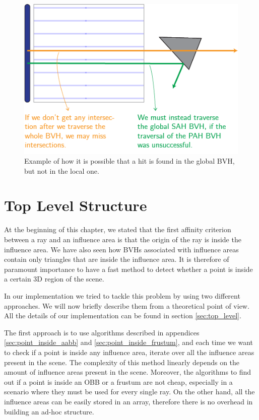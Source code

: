 \documentclass{PoliMi_MasterThesis}
\begin{document}
\begin{figure}[H]
    \centering
    \includegraphics[width=\textwidth*\real{0.55}]{Images/outside_area.png}
    \caption{Example of how it is possible that a hit is found in the global BVH, but not in the local one.}
    \label{fig:outside_area}
\end{figure}

\section{Top Level Structure} \label{sec:top_level_structure}
At the beginning of this chapter, we stated that the first affinity criterion between a ray and an influence area is that the origin of the ray is inside the influence area. We have also seen how BVHs associated with influence areas contain only triangles that are inside the influence area. It is therefore of paramount importance to have a fast method to detect whether a point is inside a certain 3D region of the scene. 

In our implementation we tried to tackle this problem by using two different approaches. We will now briefly describe them from a theoretical point of view. All the details of our implementation can be found in section \ref{sec:top_level}.

The first approach is to use algorithms described in appendices \ref{sec:point_inside_aabb} and \ref{sec:point_inside_frustum}, and each time we want to check if a point is inside any influence area, iterate over all the influence areas present in the scene. The complexity of this method linearly depends on the amount of influence areas present in the scene. Moreover, the algorithms to find out if a point is inside an OBB or a frustum are not cheap, especially in a scenario where they must be used for every single ray. On the other hand, all the influence areas can be easily stored in an array, therefore there is no overhead in building an ad-hoc structure.
\end{document}
